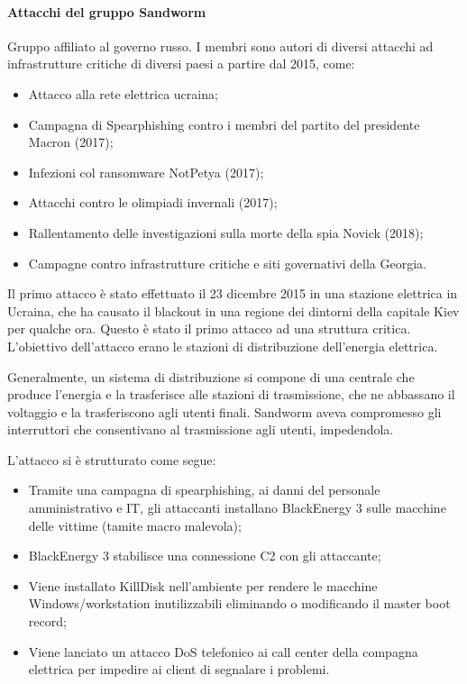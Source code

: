 \paragraph{Attacchi del gruppo Sandworm} Gruppo affiliato al governo russo. I membri sono autori di diversi attacchi ad infrastrutture critiche di diversi paesi a partire dal 2015, come:
\begin{itemize}
    \item Attacco alla rete elettrica ucraina;
    \item Campagna di Spearphishing contro i membri del partito del presidente Macron (2017);
    \item Infezioni col ransomware NotPetya (2017);
    \item Attacchi contro le olimpiadi invernali (2017);
    \item Rallentamento delle investigazioni sulla morte della spia Novick (2018);
    \item Campagne contro infrastrutture critiche e siti governativi della Georgia.
\end{itemize}

\noindent Il primo attacco è stato effettuato il 23 dicembre 2015 in una stazione elettrica in Ucraina, che ha causato il blackout in una regione dei dintorni della capitale Kiev per qualche ora. Questo è stato il primo attacco ad una struttura critica.
L'obiettivo dell'attacco erano le stazioni di distribuzione dell'energia elettrica. 

Generalmente, un sistema di distribuzione si compone di una centrale che produce l'energia e la trasferisce alle stazioni di trasmissione, che ne abbassano il voltaggio e la trasferiscono agli utenti finali. Sandworm aveva compromesso gli interruttori che consentivano al trasmissione agli utenti, impedendola.

L'attacco si è strutturato come segue:
\begin{itemize}
    \item Tramite una campagna di spearphishing, ai danni del personale amministrativo e IT, gli attaccanti installano BlackEnergy 3 sulle macchine delle vittime (tamite macro malevola);
    \item BlackEnergy 3 stabilisce una connessione C2 con gli attaccante;
    \item Viene installato KillDisk nell'ambiente per rendere le macchine Windows/workstation inutilizzabili eliminando o modificando il master boot record;
    \item Viene lanciato un attacco DoS telefonico ai call center della compagna elettrica per impedire ai client di segnalare i problemi.
\end{itemize}
 \\
 
